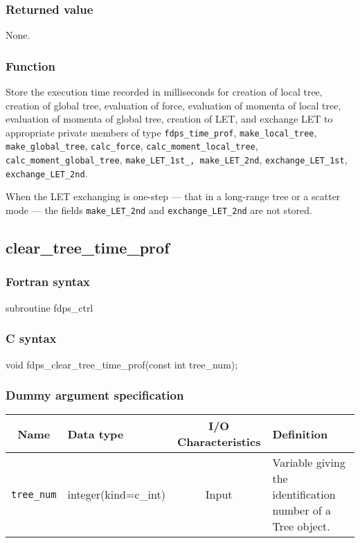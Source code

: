 \subsubsection*{Returned value}
None.


\subsubsection*{Function}
Store the execution time recorded in milliseconds for
creation of local tree, 
creation of global tree, 
evaluation of force, 
evaluation of momenta of local tree, 
evaluation of momenta of global tree, 
creation of LET,
and exchange LET
to appropriate private members of type \texttt{fdps\_time\_prof},
\texttt{make\_local\_tree}, 
\texttt{make\_global\_tree},
\texttt{calc\_force},
\texttt{calc\_moment\_local\_tree},
\texttt{calc\_moment\_global\_tree},
\texttt{make\_LET\_1st\_, make\_LET\_2nd},
\texttt{exchange\_LET\_1st},
\texttt{exchange\_LET\_2nd}.

When the LET exchanging is one-step --- that in a long-range tree or a scatter mode --- the fields \texttt{make\_LET\_2nd} and \texttt{exchange\_LET\_2nd} are not stored.
\clearpage

\subsection{clear\_tree\_time\_prof}
\subsubsection*{Fortran syntax}
\begin{screen}
\begin{spverbatim}
subroutine fdps_ctrl%
\end{spverbatim}
\end{screen}

\subsubsection*{C syntax}
\begin{screen}
\begin{spverbatim}
void fdps_clear_tree_time_prof(const int tree_num); 
\end{spverbatim}
\end{screen}

\subsubsection*{Dummy argument specification}
\begin{table}[h]
\begin{tabularx}{\linewidth}{cXcX}
\toprule
\rowcolor{Snow2}
Name & Data type & I/O Characteristics & Definition \\
\midrule
\verb|tree_num| & integer(kind=c\_int) & Input & Variable giving the identification number of a Tree object. \\
\bottomrule
\end{tabularx}
\end{table}

